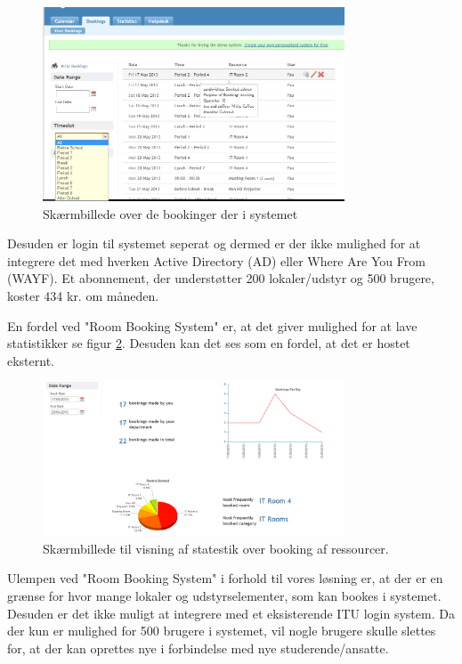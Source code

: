 \begin{figure}[h!]
  \centering
    \includegraphics[width=0.8\textwidth]{Appendix/GUI-Prototype/RoomBookingSystemList}
  \caption{Skærmbillede over de bookinger der i systemet}
\label{Comparison_RBS_RoomBookingSystemList}
\end{figure}

Desuden er login til systemet seperat og dermed er der ikke mulighed for at integrere det med hverken Active Directory (AD) eller Where Are You From (WAYF). Et abonnement, der understøtter 200 lokaler/udstyr og 500 brugere, koster 434 kr. om måneden.

En fordel ved "Room Booking System" er, at det giver mulighed for at lave statistikker se figur \ref{Comparison_RBS_RoomBookingSystemStatistic}. Desuden kan det ses som en fordel, at det er hostet eksternt.

\begin{figure}[h!]
  \centering
    \includegraphics[width=0.8\textwidth]{Appendix/GUI-Prototype/RoomBookingSystemStatistic}
  \caption{Skærmbillede til visning af statestik over booking af ressourcer.}
\label{Comparison_RBS_RoomBookingSystemStatistic}
\end{figure}

Ulempen ved "Room Booking System" i forhold til vores løsning er, at der er en grænse for hvor mange lokaler og udstyrselementer, som kan bookes i systemet. Desuden er det ikke muligt at integrere med et eksisterende ITU login system. Da der kun er mulighed for 500 brugere i systemet, vil nogle brugere skulle slettes for, at der kan oprettes nye i forbindelse med nye studerende/ansatte.

